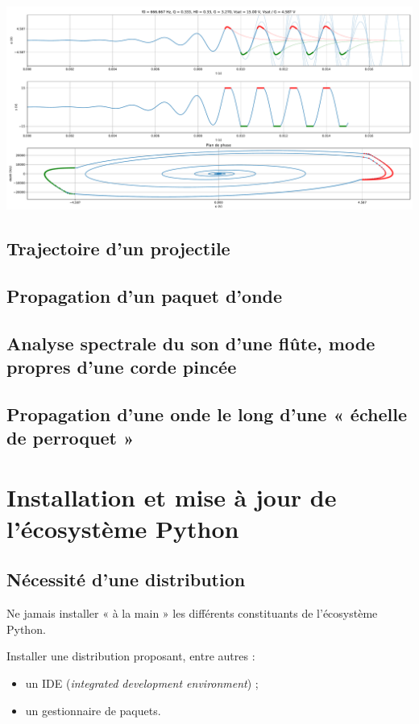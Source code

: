 \documentclass[10pt,aspectratio=169]{beamer}
\begin{document}
\begin{frame}
  \centering\includegraphics[height = .9\textheight]{plot-oscillateur-QS-python}
\end{frame}

\subsection{Trajectoire d'un projectile}

\subsection{Propagation d'un paquet d'onde}

\subsection{Analyse spectrale du son d'une flûte, mode propres d'une corde pincée}

\subsection{Propagation d'une onde le long d'une « échelle de perroquet »}


\section{Installation et mise à jour de l'écosystème Python}

\subsection{Nécessité d'une distribution}

\begin{frame}
  Ne jamais installer « à la main » les différents constituants de l'écosystème Python.
  \begin{Conseil}
    Installer une \alert{distribution} proposant, entre autres :
    \begin{itemize}
    \item un \alert{IDE} (\emph{integrated development environment}) ;
    \item un \alert{gestionnaire de paquets}.
    \end{itemize}
  \end{Conseil}
\end{frame}
\end{document}
